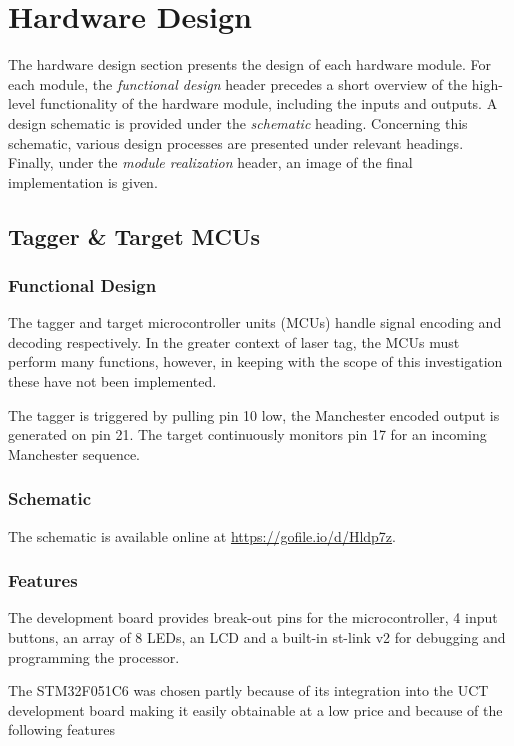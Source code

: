 \section{Hardware Design}
The hardware design section presents the design of each hardware module. For each module, the \textit{functional design} header precedes a short overview of the high-level functionality of the hardware module, including the inputs and outputs. A design schematic is provided under the \textit{schematic} heading. Concerning this schematic, various design processes are presented under relevant headings. Finally, under the \textit{module realization} header, an image of the final implementation is given.


\subsection{Tagger \& Target MCUs}

\subsubsection{Functional Design}
The tagger and target microcontroller units (MCUs) handle signal encoding and decoding respectively. In the greater context of laser tag, the MCUs must perform many functions, however, in keeping with the scope of this investigation these have not been implemented.

The tagger is triggered by pulling pin 10 low, the Manchester encoded output is generated on pin 21. The target continuously monitors pin 17 for an incoming Manchester sequence.

\subsubsection{Schematic}
The schematic is available online at \href{https://gofile.io/d/Hldp7z}{https://gofile.io/d/Hldp7z}.


\subsubsection{Features}

The development board provides break-out pins for the microcontroller, 4 input buttons, an array of 8 LEDs, an LCD and a built-in st-link v2 for debugging and programming the processor.

The STM32F051C6 was chosen partly because of its integration into the UCT development board making it easily obtainable at a low price and because of the following features

